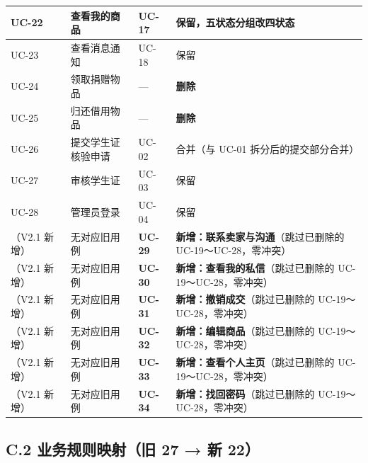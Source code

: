 \documentclass[12pt,a4paper]{ctexart}
\begin{document}
{\begin{longtable}{|p{2.44cm}|p{4.03cm}|p{2.44cm}|p{7.09cm}|}
\hline
UC-22 & 查看我的商品 & UC-17 & 保留，\textbf{五状态分组改四状态} \\
\hline
UC-23 & 查看消息通知 & UC-18 & 保留 \\
\hline
UC-24 & 领取捐赠物品 & — & \textbf{删除} \\
\hline
UC-25 & 归还借用物品 & — & \textbf{删除} \\
\hline
UC-26 & 提交学生证核验申请 & UC-02 & 合并（与 UC-01 拆分后的提交部分合并） \\
\hline
UC-27 & 审核学生证 & UC-03 & 保留 \\
\hline
UC-28 & 管理员登录 & UC-04 & 保留 \\
\hline
（V2.1 新增） & 无对应旧用例 & \textbf{UC-29} & \textbf{新增：联系卖家与沟通}（跳过已删除的 UC-19～UC-28，零冲突） \\
\hline
（V2.1 新增） & 无对应旧用例 & \textbf{UC-30} & \textbf{新增：查看我的私信}（跳过已删除的 UC-19～UC-28，零冲突） \\
\hline
（V2.1 新增） & 无对应旧用例 & \textbf{UC-31} & \textbf{新增：撤销成交}（跳过已删除的 UC-19～UC-28，零冲突） \\
\hline
（V2.1 新增） & 无对应旧用例 & \textbf{UC-32} & \textbf{新增：编辑商品}（跳过已删除的 UC-19～UC-28，零冲突） \\
\hline
（V2.1 新增） & 无对应旧用例 & \textbf{UC-33} & \textbf{新增：查看个人主页}（跳过已删除的 UC-19～UC-28，零冲突） \\
\hline
（V2.1 新增） & 无对应旧用例 & \textbf{UC-34} & \textbf{新增：找回密码}（跳过已删除的 UC-19～UC-28，零冲突） \\
\hline
\end{longtable}
}


\subsection*{C.2 业务规则映射（旧 27 → 新 22）}
\end{document}
